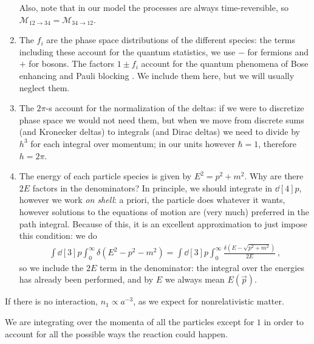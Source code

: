 \documentclass[main.tex]{subfiles}
\begin{document}
\begin{enumerate}
  Also, note that in our model the processes are always time-reversible, so \(\mathcal{M}_{12 \to 34} = \mathcal{M}_{34 \to 12}\).
  \item The \(f_{i}\) are the phase space distributions of the different species: the terms including these account for the quantum statistics, we use \(-\) for fermions and \(+\) for bosons. The factors \(1 \pm f_i\) account for the quantum phenomena of Bose enhancing and Pauli blocking \cite[]{nordheimKineticMethodNew1928}. We include them here, but we will usually neglect them. 
  \item The \(2\pi \)-s account for the normalization of the deltas: if we were to discretize phase space we would not need them, but when we move from discrete sums (and Kronecker deltas) to integrals (and Dirac deltas) we need to divide by \(h^3\) for each integral over momentum; in our units however \(\hbar = 1\), therefore \(h = 2 \pi \). 
  \item The energy of each particle species is given by  \(E^2 = p^2+m^2\). 
  Why are there \(2E\) factors in the denominators? In principle, we should integrate in \(\dd[4]{p}\), however we work \emph{on shell}: a priori, the particle does whatever it wants, however solutions to the equations of motion are (very much) preferred in the path integral.
  Because of this, it is an excellent approximation to just impose this condition: we do 
  \begin{align}
  \int \dd[3]{p} \int_{0}^{ \infty } \delta (E^2- p^2-m^2) 
  = \int \dd[3]{p} \int_{0}^{ \infty } \frac{ \delta (E - \sqrt{p^2+m^2})}{2E}
  \,,
  \end{align}
  so we include the \(2E\) term in the denominator: the integral over the energies has already been performed, and by \(E\) we always mean \(E(\vec{p})\). 
\end{enumerate}


If there is no interaction, \(n_1 \propto a^{-3}\), as we expect for nonrelativistic matter. 

We are integrating over the momenta of all the particles except for \(1\) in order to account for all the possible ways the reaction could happen. 
\end{document}
